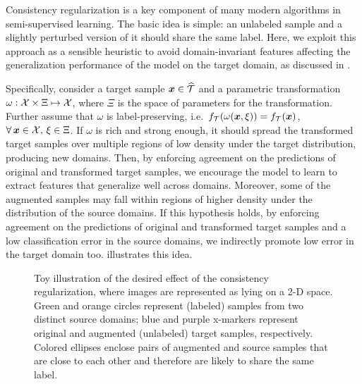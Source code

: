 Consistency regularization is a key component of many modern algorithms in semi-supervised learning. The basic idea is simple: an unlabeled sample and a slightly perturbed version of it should share the same label. Here, we exploit this approach as a sensible heuristic to avoid domain-invariant features affecting the generalization performance of the model on the target domain, as discussed in .

Specifically, consider a target sample ${\bm{x}} \in \widehat{{\mathcal{T}}}$ and a parametric transformation $\omega: {\mathcal{X}} \times \Xi \mapsto {\mathcal{X}}$, where $\Xi$ is the space of parameters for the transformation. Further assume that $\omega$ is label-preserving, i.e.\ $f_{\mathcal{T}}(\omega({\bm{x}}, \xi)) = f_{\mathcal{T}}({\bm{x}})$, $\forall\, {\bm{x}} \in {\mathcal{X}}, \, \xi \in \Xi$. If $\omega$ is rich and strong enough, it should spread the transformed target samples over multiple regions of low density under the target distribution, producing new domains. Then, by enforcing agreement on the predictions of original and transformed target samples, we encourage the model to learn to extract features that generalize well across domains. Moreover, some of the augmented samples may fall within regions of higher density under the distribution of the source domains. If this hypothesis holds, by enforcing agreement on the predictions of original and transformed target samples and a low classification error in the source domains, we indirectly promote low error in the target domain too.  illustrates this idea.

\begin{figure}[h]
    \centering
    \caption{Toy illustration of the desired effect of the consistency regularization, where images are represented as lying on a 2-D space. Green and orange circles represent (labeled) samples from two distinct source domains; blue and purple x-markers represent original and augmented (unlabeled) target samples, respectively. Colored ellipses enclose pairs of augmented and source samples that are close to each other and therefore are likely to share the same label.}
    \label{fig:consistency}
\end{figure}

